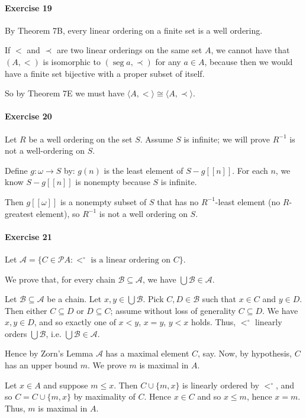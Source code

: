 \documentclass{report}
\newcommand{\inv}[1]{\ensuremath{{#1}^{-1}}}
\newcommand{\seg}{\ensuremath{\operatorname{seg}}}
\begin{document}
    \paragraph{Exercise 19}
    By Theorem 7B, every linear ordering on a finite set is a well ordering.

    If $<$ and $\prec$ are two linear orderings on the same set $A$, we cannot have that
    $(A, <)$ is isomorphic to $(\seg a, \prec)$ for any $a \in A$, because then we would have a finite set
    bijective with a proper subset of itself.

    So by Theorem 7E we must have $\langle A, < \rangle \cong \langle A, \prec \rangle$.

    \paragraph{Exercise 20}
    Let $R$ be a well ordering on the set $S$.  Assume $S$ is infinite; we will prove $\inv{R}$ is not
    a well-ordering on $S$.

    Define $g : \omega \rightarrow S$ by: $g(n)$ is the least element of $S - g[\![n]\!]$. For each $n$,
    we know $S - g[\![n]\!]$ is nonempty because $S$ is infinite.

    Then $g[\![\omega]\!]$ is a nonempty subset of $S$ that has no $\inv{R}$-least element (no $R$-greatest
    element), so $\inv{R}$ is not a well ordering on $S$.

    \paragraph{Exercise 21}
    Let $\mathcal{A} = \{ C \in \mathcal{P} A : <^\circ \text{ is a linear ordering on } C \}$.

    We prove that, for every chain $\mathcal{B} \subseteq \mathcal{A}$, we have $\bigcup \mathcal{B} \in
    \mathcal{A}$.

    Let $\mathcal{B} \subseteq \mathcal{A}$ be a chain. Let $x, y \in \bigcup \mathcal{B}$. Pick $C, D \in
    \mathcal{B}$ such that $x \in C$ and $y \in D$. Then either $C \subseteq D$ or $D \subseteq C$;
    assume without loss of generality $C \subseteq D$. We have $x,y \in D$, and so exactly one of $x < y$, $x = y$, $y < x$ holds.
    Thus, $<^\circ$ linearly orders $\bigcup \mathcal{B}$, i.e. $\bigcup \mathcal{B} \in \mathcal{A}$.

    Hence by Zorn's Lemma $\mathcal{A}$ has a maximal element $C$, say. Now, by hypothesis, $C$ has an upper bound
    $m$. We prove $m$ is maximal in $A$.

    Let $x \in A$ and suppose $m \leq x$. Then $C \cup \{ m, x \}$ is linearly ordered by $<^\circ$,
    and so $C = C \cup \{ m,x \}$ by maximality of $C$. Hence $x \in C$ and so $x \leq m$, hence $x = m$. Thus,
    $m$ is maximal in $A$.
\end{document}
